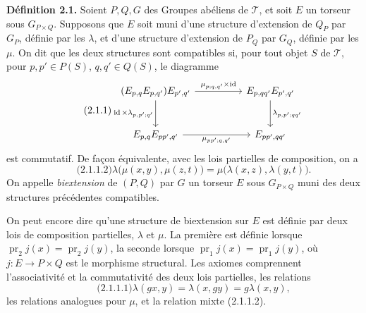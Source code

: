 \documentclass[11pt]{article}
\providecommand{\pr}{\operatorname{pr}}
\providecommand{\id}{\operatorname{id}}
\begin{document}
\textbf{Définition 2.1.}  Soient \(P,Q,G\) des Groupes abéliens de \(\mathcal T\), et soit \(E\) un torseur sous \(G_{P\times Q}\).  Supposons que \(E\) soit muni d'une structure d'extension de \(Q_P\) par \(G_P\), définie par les \(\lambda\), et d'une structure d'extension de \(P_Q\) par \(G_Q\), définie par les \(\mu\).  On dit que les deux structures sont compatibles si, pour tout objet \(S\) de \(\mathcal T\), pour \(p,p'\in P(S)\), \(q,q'\in Q(S)\), le diagramme
\begin{equation}\qquad\text{(2.1.1)}
\begin{tikzcd}[column sep=huge,row sep=large]
(E_{p,q}E_{p,q'})E_{p',q'}
\arrow[r,"\mu_{p;q,q'}\times\id"]
\arrow[d,"\id\times\lambda_{p,p';q'}"']
& E_{p,qq'}E_{p',q'}\arrow[d,"\lambda_{p,p';qq'}"]\\
E_{p,q}E_{pp',q'}\arrow[r,"\mu_{pp';q,q'}"']&E_{pp',qq'}
\end{tikzcd}
\end{equation}
est commutatif.  De façon équivalente, avec les lois partielles de composition, on a
\begin{equation}\qquad\text{(2.1.1.2)}
  \lambda\bigl(\mu(x,y),\mu(z,t)\bigr)
  =
  \mu\bigl(\lambda(x,z),\lambda(y,t)\bigr).
\end{equation}
On appelle \emph{biextension} de \((P,Q)\) par \(G\) un torseur \(E\) sous \(G_{P\times Q}\) muni des deux structures précédentes compatibles.

On peut encore dire qu'une structure de biextension sur \(E\) est définie par deux lois de composition partielles, \(\lambda\) et \(\mu\).  La première est définie lorsque \(\pr_2 j(x)=\pr_2 j(y)\), la seconde lorsque \(\pr_1 j(x)=\pr_1 j(y)\), où \(j:E\to P\times Q\) est le morphisme structural.  Les axiomes comprennent l'associativité et la commutativité des deux lois partielles, les relations
\begin{equation}\qquad\text{(2.1.1.1)}
  \lambda(gx,y)=\lambda(x,gy)=g\lambda(x,y),
\end{equation}
les relations analogues pour \(\mu\), et la relation mixte (2.1.1.2).
\end{document}
